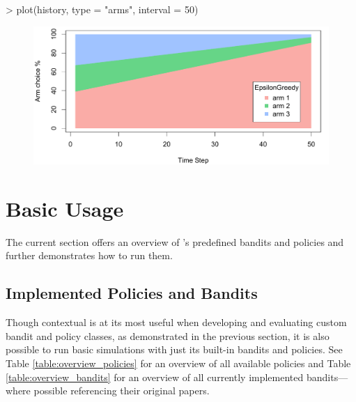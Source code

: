 \documentclass{jss}
\begin{document}
\begin{CodeChunk}
\begin{CodeInput}
> plot(history, type = "arms", interval = 50)
\end{CodeInput}
\end{CodeChunk}
\begin{figure}[H]
\centering
\includegraphics[width=.99\textwidth]{fig/section_2_3}
\label{fig:section_2_3}
\end{figure}


\section{Basic Usage} \label{basicusage}

The current section offers an overview of 's predefined bandits and policies and further demonstrates how to run them.

\subsection{Implemented Policies and Bandits} \label{implbp}

Though contextual is at its most useful when developing and evaluating custom bandit and policy classes, as demonstrated in the previous section, it is also possible to run basic simulations with just its built-in bandits and policies. See Table \ref{table:overview_policies} for an overview of all available policies and Table \ref{table:overview_bandits} for an overview of all currently implemented bandits---where possible referencing their original papers.
\end{document}
